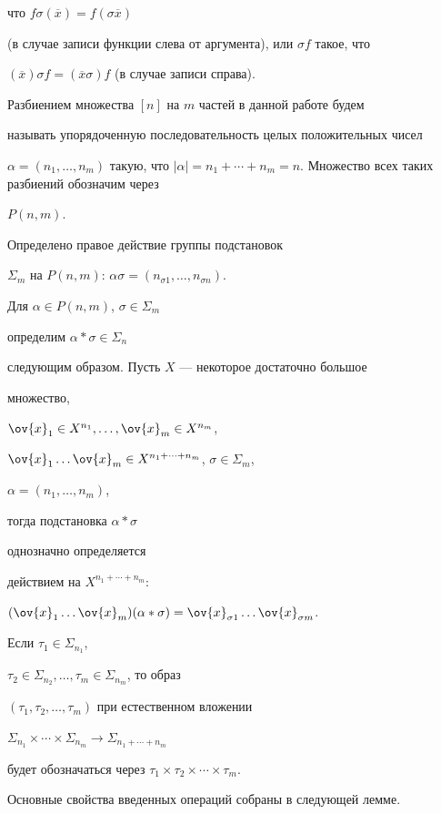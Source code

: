 что $f\sigma (\overline{x})= f(\sigma \overline{x})$


(в случае записи функции слева от аргумента), или $\sigma f$ такое, что


$(\overline{x})\sigma f = (\overline{x}\sigma)f$ (в случае записи справа).


Разбиением множества $[n]$ на $m$ частей в данной работе будем


называть упорядоченную последовательность целых положительных чисел


$\alpha=(n_1,\dotsc,n_m)$ такую, что $|\alpha|=


n_1+ \dotsb + n_m =n$. Множество всех таких разбиений обозначим через


$P(n,m)$.


Определено правое действие группы подстановок


$\Sigma_m$ на $P(n,m)$: $\alpha\sigma=


(n_{\sigma 1},\dotsc,n_{\sigma n})$.


Для $\alpha\in P(n,m)$, $\sigma\in \Sigma_m$


определим $\alpha * \sigma\in \Sigma_n$


следующим образом. Пусть $X$ --- некоторое достаточно большое


множество,


$\ov{x}_1\in X^{n_1},\dotsc,\ov{x}_m\in X^{n_m}$,


$\ov{x}_1 \dotsc \ov{x}_m\in X^{n_1+\dotsb +n_m}$, $\sigma\in \Sigma_m$,


$\alpha=(n_1,\dotsc,n_m)$,


тогда подстановка $\alpha*\sigma$


однозначно определяется


действием на $X^{ n_1+\dotsb +n_m }$:


$(\ov{x}_1 \dotsc \ov{x}_m)(\alpha*\sigma)=


\ov{x}_{\sigma 1} \dotsc \ov{x}_{\sigma m}$.


Если $\tau_1\in \Sigma_{n_1}$,


$\tau_2\in\Sigma_{n_2},\dotsc,\tau_m\in \Sigma_{n_m}$, то образ


$(\tau_1,\tau_2,\dotsc,\tau_m)$ при естественном вложении


$\Sigma_{n_1}\times \dotsb \times \Sigma_{n_m} \to \Sigma_{n_1+\dotsb+n_m}$


будет обозначаться через $\tau_1 \times \tau_2 \times \dotsb \times \tau_m$.


Основные свойства введенных операций собраны в следующей лемме.





